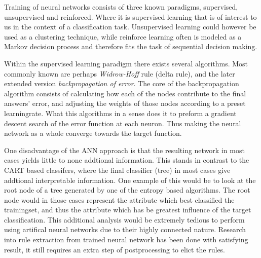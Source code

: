 	
	\bigskip\noindent
	Training of neural networks consists of three known paradigms, supervised, unsupervised and reinforced. 
	Where it is supervised learning that is of interest to us in the context of a classification task. 
	Unsupervised learning could however be used as a clustering technique, 
	while reinforce learning often is modeled as a Markov decision process and therefore fits the task of sequential decision making. \cite{bioAI}
	
	\bigskip\noindent
	Within the supervised learning paradigm there exists several algorithms. 
	Most commonly known are perhaps \textit{Widrow-Hoff} rule (delta rule)\cite{widrowhoff}, and the later extended version \textit{backpropagation of error}\cite{rumelhart1986learning}\cite{rumelhart1986parallel}. 
	The core of the backpropagation algorithm consists of calculating how each of the nodes contribute to the final answers' error, 
	and adjusting the weights of those nodes according to a preset learningrate. 
	What this algorithms in a sense does it to preform a gradient descent search of the error function at each neuron.
	Thus making the neural network as a whole converge towards the target function. 
	
	\bigskip\noindent
	One disadvantage of the ANN approach is that the resulting network in most cases yields little to none addtional information.
	This stands in contrast to the CART based classifers, where the final classifier (tree) in most cases give addtional interpretable information. 
	One example of this would be to look at the root node of a tree generated by one of the entropy based algorithms.
	The root node would in those cases represent the attribute which best classified the trainingset, 
	and thus the attribute which has be greatest influence of the target classification. 
	This additional analysis would be extremely tedious to perform using artifical neural networks due to their highly connected nature.
	Research into rule extraction from trained neural network has been done with satisfying result, 
	it still requires an extra step of postprocessing to elict the rules.~\cite{augastarule}
	
	
	
	
	
	
